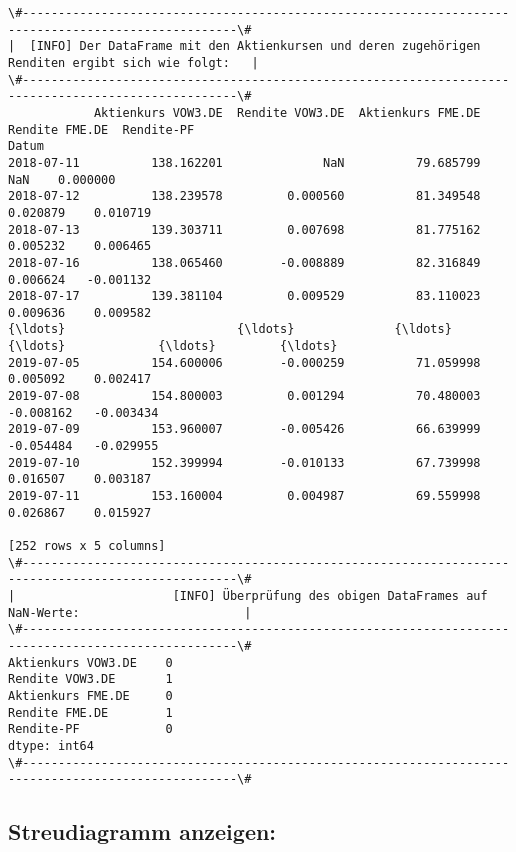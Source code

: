 \documentclass[paper=landscape]{scrartcl}
\begin{document}
    \begin{Verbatim}[commandchars=\\\{\}]
\#----------------------------------------------------------------------------------------------------\#
|  [INFO] Der DataFrame mit den Aktienkursen und deren zugehörigen Renditen ergibt sich wie folgt:   |
\#----------------------------------------------------------------------------------------------------\#
            Aktienkurs VOW3.DE  Rendite VOW3.DE  Aktienkurs FME.DE  Rendite FME.DE  Rendite-PF
Datum                                                                                         
2018-07-11          138.162201              NaN          79.685799             NaN    0.000000
2018-07-12          138.239578         0.000560          81.349548        0.020879    0.010719
2018-07-13          139.303711         0.007698          81.775162        0.005232    0.006465
2018-07-16          138.065460        -0.008889          82.316849        0.006624   -0.001132
2018-07-17          139.381104         0.009529          83.110023        0.009636    0.009582
{\ldots}                        {\ldots}              {\ldots}                {\ldots}             {\ldots}         {\ldots}
2019-07-05          154.600006        -0.000259          71.059998        0.005092    0.002417
2019-07-08          154.800003         0.001294          70.480003       -0.008162   -0.003434
2019-07-09          153.960007        -0.005426          66.639999       -0.054484   -0.029955
2019-07-10          152.399994        -0.010133          67.739998        0.016507    0.003187
2019-07-11          153.160004         0.004987          69.559998        0.026867    0.015927

[252 rows x 5 columns]
\#----------------------------------------------------------------------------------------------------\#
|                      [INFO] Überprüfung des obigen DataFrames auf NaN-Werte:                       |
\#----------------------------------------------------------------------------------------------------\#
Aktienkurs VOW3.DE    0
Rendite VOW3.DE       1
Aktienkurs FME.DE     0
Rendite FME.DE        1
Rendite-PF            0
dtype: int64
\#----------------------------------------------------------------------------------------------------\#

    \end{Verbatim}

    \hypertarget{streudiagramm-anzeigen}{%
\subsection{Streudiagramm anzeigen:}\label{streudiagramm-anzeigen}}
\end{document}
